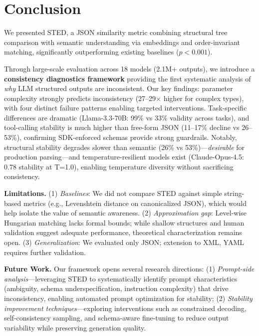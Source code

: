 \documentclass{article}
\theoremstyle{plain}
\theoremstyle{definition}
\begin{document}
\section{Conclusion}

We presented STED, a JSON similarity metric combining structural tree comparison with semantic understanding via embeddings and order-invariant matching, significantly outperforming existing baselines ($p<0.001$).

Through large-scale evaluation across 18 models (2.1M+ outputs), we introduce a \textbf{consistency diagnostics framework} providing the first systematic analysis of \textit{why} LLM structured outputs are inconsistent. Our key findings: parameter complexity strongly predicts inconsistency (27--29$\times$ higher for complex types), with four distinct failure patterns enabling targeted interventions. Task-specific differences are dramatic (Llama-3.3-70B: 99\% vs 33\% validity across tasks), and tool-calling stability is much higher than free-form JSON (11--17\% decline vs 26--53\%), confirming SDK-enforced schemas provide strong guardrails. Notably, structural stability degrades slower than semantic (26\% vs 53\%)---\textit{desirable} for production parsing---and temperature-resilient models exist (Claude-Opus-4.5: 0.78 stability at T=1.0), enabling temperature diversity without sacrificing consistency.

\textbf{Limitations.} (1) \textit{Baselines}: We did not compare STED against simple string-based metrics (e.g., Levenshtein distance on canonicalized JSON), which would help isolate the value of semantic awareness. (2) \textit{Approximation gap}: Level-wise Hungarian matching lacks formal bounds; while shallow structures and human validation suggest adequate performance, theoretical characterization remains open. (3) \textit{Generalization}: We evaluated only JSON; extension to XML, YAML requires further validation.

\textbf{Future Work.} Our framework opens several research directions: (1) \textit{Prompt-side analysis}---leveraging STED to systematically identify prompt characteristics (ambiguity, schema underspecification, instruction complexity) that drive inconsistency, enabling automated prompt optimization for stability; (2) \textit{Stability improvement techniques}---exploring interventions such as constrained decoding, self-consistency sampling, and schema-aware fine-tuning to reduce output variability while preserving generation quality.



\end{document}
